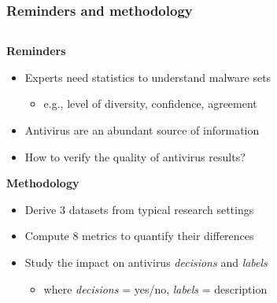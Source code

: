 \begin{frame}
    \frametitle{Reminders and methodology}
    \small{}

    \begin{columns}
        \begin{column}{0.8\textwidth}
            \begin{block}{}
                \centering
                \textbf{Reminders}
            \end{block}
            \begin{itemize}
                \item Experts need statistics to understand malware sets
                \begin{itemize}
                    \item e.g., level of diversity, confidence, agreement
                \end{itemize}
                \item Antivirus are an abundant source of information
                \item How to verify the quality of antivirus results?
            \end{itemize}

            \begin{block}{}
                \centering
                \textbf{Methodology}
            \end{block}
            \begin{itemize}
                \item Derive 3 datasets from typical research settings
                \item Compute 8 metrics to quantify their differences
                \item Study the impact on antivirus \textit{decisions} and \textit{labels}
                \begin{itemize}
                    \item where \textit{decisions} = yes/no, \textit{labels} = description
                \end{itemize}
            \end{itemize}
        \end{column}


\end{columns}
\end{frame}
